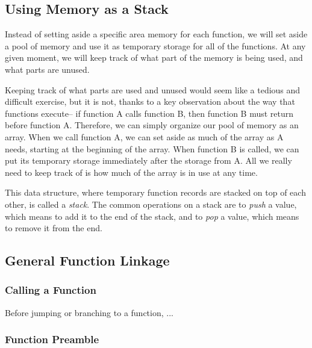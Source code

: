 \documentclass[makeidx,psfig]{article}
\begin{document}
\subsection{Using Memory as a Stack}

Instead of setting aside a specific area memory for each function, we
will set aside a pool of memory and use it as temporary storage for
all of the functions.  At any given moment, we will keep track of what
part of the memory is being used, and what parts are unused.

Keeping track of what parts are used and unused would seem like a
tedious and difficult exercise, but it is not, thanks to a key
observation about the way that functions execute-- if function A calls
function B, then function B must return before function A.  Therefore,
we can simply organize our pool of memory as an array.  When we call
function A, we can set aside as much of the array as A needs, starting
at the beginning of the array.  When function B is called, we can put
its temporary storage immediately after the storage from A.  All we
really need to keep track of is how much of the array is in use at any
time.

This data structure, where temporary function records are stacked on
top of each other, is called a {\em stack}.  The common operations on
a stack are to {\em push} a value, which means to add it to the end of
the stack, and to {\em pop} a value, which means to remove it from the
end.

\subsection{General Function Linkage}

\subsubsection{Calling a Function}

Before jumping or branching to a function, ...

\subsubsection{Function Preamble}
\end{document}
